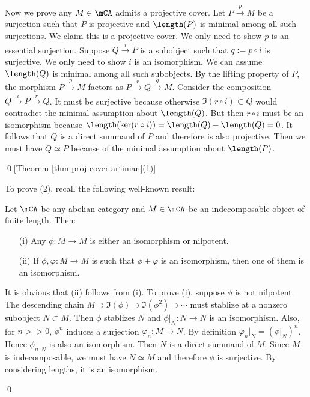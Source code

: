 		Now we prove any $M\in \mCA$ admits a projective cover. Let $P\xrightarrow{p} M$ be a surjection such that $P$ is projective and $\length(P)$ is minimal among all such surjections. We claim this is a projective cover. We only need to show $p$ is an essential surjection. Suppose $Q\xrightarrow{i} P$ is a subobject such that $q:=p\circ i$ is surjective. We only need to show $i$ is an isomorphism. We can assume $\length(Q)$ is minimal among all such subobjects. By the lifting property of $P$, the morphism $P\xrightarrow{p} M$ factors as $P\xrightarrow{r} Q \xrightarrow{q} M$. Consider the composition $Q\xrightarrow{i} P \xrightarrow{r} Q$. It must be surjective because otherwise $\Im(r\circ i) \subset Q$ would contradict the minimal assumption about $\length(Q)$. But then $r\circ i$ must be an isomorphism because $\length(\ker(r \circ i)) = \length(Q)-\length(Q) = 0$. It follows that $Q$ is a direct summand of $P$ and therefore is also projective. Then we must have $Q\simeq P$ because of the minimal assumption about $\length(P)$.

	\qed[Theorem \ref{thm-proj-cover-artinian}(1)]

	To prove (2), recall the following well-known result:

		\begin{lem}
			Let $\mCA$ be any abelian category and $M\in \mCA$ be an indecomposable object of finite length. Then:
			\begin{itemize}
				\item[(i)]
					Any $\phi:M\to M$ is either an isomorphism or nilpotent.
				\item[(ii)]
					If $\phi,\varphi:M\to M$ is such that $\phi+\varphi$ is an isomorphism, then one of them is an isomorphism.
			\end{itemize}
		\end{lem}

		\proof
			It is obvious that (ii) follows from (i). To prove (i), suppose $\phi$ is not nilpotent. The descending chain $M \supset \Im(\phi) \supset \Im(\phi^2) \supset \cdots$ must stablize at a nonzero subobject $N\subset M$. Then $\phi$ stablizes $N$ and $\phi|_N: N\to N$ is an isomorphism. Also, for $n>>0$, $\phi^n$ induces a surjection $\varphi_n: M\to N$. By definition $\varphi_n|_N = (\phi|_N)^n$. Hence $\phi_n|_N$ is also an isomorphism. Then $N$ is a direct summand of $M$. Since $M$ is indecomposable, we must have $N\simeq M$ and therefore $\phi$ is surjective. By considering lengths, it is an isomorphism.

		\qed

